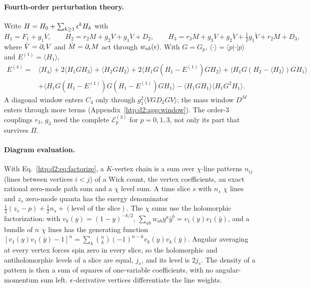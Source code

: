 \paragraph{Fourth-order perturbation theory.} Write $H=H_0+\sum_{k\ge1}\epsilon^kH_k$ with
\begin{equation}
 H_1=F_1+g_1V,\qquad H_2=r_2M+g_2V+g_1\dot V+D_2,\qquad H_3=r_3M+g_3V+g_2\dot V+\tfrac12g_1\ddot V+r_2\dot M+D_3 ,
\end{equation}
where $\dot V=\partial_\epsilon V$ and $\dot M=\partial_\epsilon M$ act through $w_{ab}(\epsilon)$. With $G=G_p$, $\langle\cdot\rangle=\langle
p|\cdot|p\rangle$ and $E^{(1)}=\langle H_1\rangle$,
\begin{align}
 E^{(4)}={}&\langle H_4\rangle+2\langle H_1GH_3\rangle+\langle H_2GH_2\rangle+2\langle H_1G(H_1-E^{(1)})GH_2\rangle
 +\langle H_1G(H_2-\langle H_2\rangle)GH_1\rangle\nonumber\\
 &+\langle H_1G(H_1-E^{(1)})G(H_1-E^{(1)})GH_1\rangle-\langle H_1GH_1\rangle\langle H_1G^2H_1\rangle .
\end{align}
A diagonal window enters $C_4$ only through $g_1^2\langle VGD_2GV\rangle$; the mass window $D^M$ enters through more
terms (Appendix~\ref{htp:d2:app:window}). The order-3 couplings $r_3$, $g_3$ need the complete
$\mathcal E^{(3)}_p$ for $p=0,1,3$, not only its part that survives $\Pi$.

\paragraph{Diagram evaluation.} With Eq.~\eqref{htp:d2:eq:factorize}, a $K$-vertex chain is a sum over $\chi$-line patterns
$n_{ij}$ (lines between vertices $i<j$) of a Wick count, the vertex coefficients, an exact rational zero-mode path sum and
a $\chi$ level sum. A time slice $s$ with $n_s$ $\chi$ lines and $z_s$ zero-mode quanta has the energy denominator
$\frac12(z_s-p)+\frac12n_s+(\text{level of the slice})$. The $\chi$ sums use the holomorphic factorization: with
$v_k(y)=(1-y)^{-k/2}$, $\sum_{ab}w_{ab}y^a\bar y^b=v_1(y)v_1(\bar y)$, and a bundle of $n$ $\chi$ lines has the generating
function $[v_1(y)v_1(\bar y)-1]^n=\sum_k\binom nk(-1)^{n-k}v_k(y)v_k(\bar y)$. Angular averaging at every vertex forces spin
zero in every slice, so the holomorphic and antiholomorphic levels of a slice are equal, $j_s$, and its level is $2j_s$.
The density of a pattern is then a sum of squares of one-variable coefficients, with no angular-momentum sum left.
$\epsilon$-derivative vertices differentiate the line weights.


